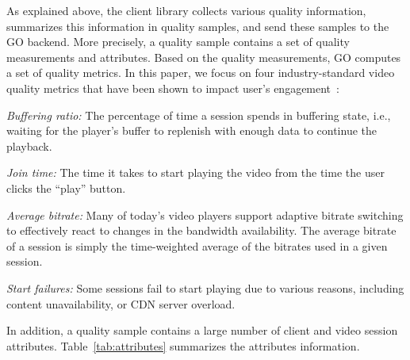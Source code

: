 \label{subsec:dataset}

As explained above, the client library collects various quality
information, summarizes this information in quality samples, and send
these samples to the GO backend. More precisely, a quality sample
contains a set of quality measurements and attributes. Based on the
quality measurements, GO computes a set of quality metrics. In this
paper, we focus on four industry-standard video quality metrics that
have been shown to impact user's engagement~\cite{sigcomm11}:
\begin{packedenumerate}
\item \emph{Buffering ratio:} The percentage of time a session spends
  in buffering state, i.e., waiting for the player's buffer to
  replenish with enough data to continue the playback.
\item \emph{Join time:} The time it takes to start playing the video
  from the time the user clicks the ``play'' button.
\item \emph{Average bitrate:} Many of today's video players support
  adaptive bitrate switching to effectively react to changes in the
  bandwidth availability. The average bitrate of a session is simply
  the time-weighted average of the bitrates used in a given session.
\item \emph{Start failures:} Some sessions fail to start playing due
  to various reasons, including content unavailability, or CDN server
  overload.
\end{packedenumerate}


In addition, a quality sample contains a large number of client and
video session attributes. Table~\ref{tab:attributes} summarizes the attributes information.

